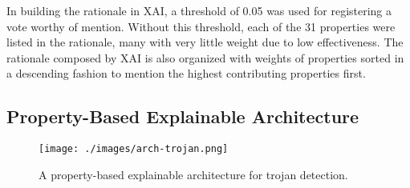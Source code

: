 In building the rationale in XAI, a threshold of 0.05 was used for registering a
vote worthy of mention.  Without this threshold, each of the 31 properties were
listed in the rationale, many with very little weight due to low effectiveness.
The rationale composed by XAI is also organized with weights of properties
sorted in a descending fashion to mention the highest contributing properties
first.

\subsection{Property-Based Explainable Architecture}



\begin{figure}[H]
    \centering
    \texttt{[image: ./images/arch-trojan.png]}
    \caption{A property-based explainable architecture for trojan detection.}
    \label{fig:trojan_arch}
\end{figure}

